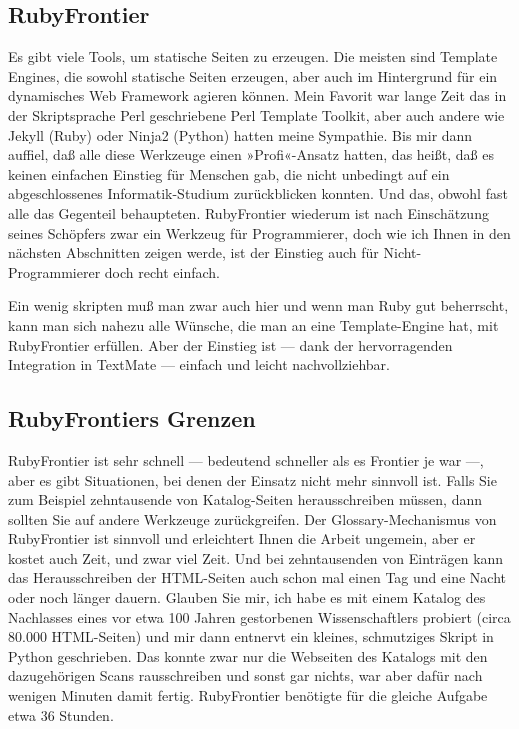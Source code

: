 \documentclass[11pt]{report}
\begin{document}
\subsection{RubyFrontier}
\label{sec-1-1-2-2}


Es gibt viele Tools, um statische Seiten zu erzeugen. Die meisten sind
Template Engines, die sowohl statische Seiten erzeugen, aber auch im
Hintergrund für ein dynamisches Web Framework agieren können. Mein
Favorit war lange Zeit das in der Skriptsprache Perl geschriebene Perl
Template Toolkit, aber auch andere wie Jekyll (Ruby) oder Ninja2
(Python) hatten meine Sympathie. Bis mir dann auffiel, daß alle diese
Werkzeuge einen »Profi«-Ansatz hatten, das heißt, daß es keinen
einfachen Einstieg für Menschen gab, die nicht unbedingt auf ein
abgeschlossenes Informatik-Studium zurückblicken konnten. Und das,
obwohl fast alle das Gegenteil behaupteten. RubyFrontier wiederum ist
nach Einschätzung seines Schöpfers zwar ein Werkzeug für
Programmierer, doch wie ich Ihnen in den nächsten Abschnitten zeigen
werde, ist der Einstieg auch für Nicht-Programmierer doch recht
einfach.


Ein wenig skripten muß man zwar auch hier und wenn man Ruby gut
beherrscht, kann man sich nahezu alle Wünsche, die man an eine
Template-Engine hat, mit RubyFrontier erfüllen. Aber der Einstieg ist
— dank der hervorragenden Integration in TextMate — einfach und leicht
nachvollziehbar.
\subsection{RubyFrontiers Grenzen}
\label{sec-1-1-2-3}


RubyFrontier ist sehr schnell — bedeutend schneller als es Frontier je
war —, aber es gibt Situationen, bei denen der Einsatz nicht mehr
sinnvoll ist. Falls Sie zum Beispiel zehntausende von Katalog-Seiten
herausschreiben müssen, dann sollten Sie auf andere Werkzeuge
zurückgreifen. Der Glossary-Mechanismus von RubyFrontier ist sinnvoll
und erleichtert Ihnen die Arbeit ungemein, aber er kostet auch Zeit,
und zwar viel Zeit. Und bei zehntausenden von Einträgen kann das
Herausschreiben der HTML-Seiten auch schon mal einen Tag und eine
Nacht oder noch länger dauern. Glauben Sie mir, ich habe es mit einem
Katalog des Nachlasses eines vor etwa 100 Jahren gestorbenen
Wissenschaftlers probiert (circa 80.000 HTML-Seiten) und mir dann
entnervt ein kleines, schmutziges Skript in Python geschrieben. Das
konnte zwar nur die Webseiten des Katalogs mit den dazugehörigen Scans
rausschreiben und sonst gar nichts, war aber dafür nach wenigen
Minuten damit fertig. RubyFrontier benötigte für die gleiche Aufgabe
etwa 36 Stunden.
\end{document}
